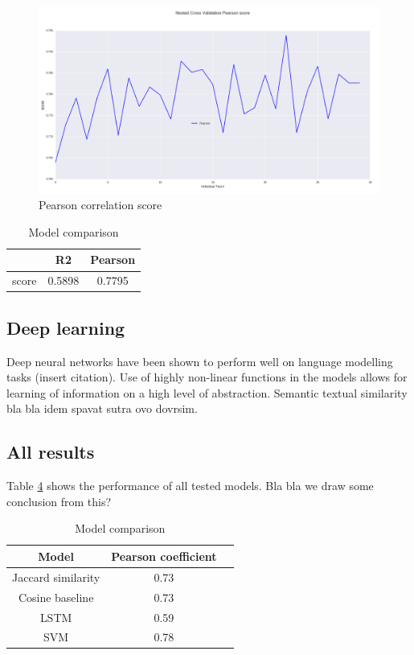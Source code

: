 \documentclass[10pt, a4paper]{article}
\begin{document}
\begin{table}[h!]
\begin{figure}[h!]
\begin{center}
	\centering
	\includegraphics[scale=0.36]{Pearson.png}
	\caption{Pearson correlation score}
\end{center}
\end{figure}

\begin{table}
\caption{Averaged scores}
\label{tab:narrow-table}
\begin{center}
\begin{tabular}{ccc}
\toprule
& R2 & Pearson\\
\midrule
score & 0.5898 & 0.7795 \\
\bottomrule
\end{tabular}
\end{center}
\end{table}

\subsection{Deep learning}

Deep neural networks have been shown to perform well on language modelling tasks
(insert citation). Use of highly non-linear functions in the models allows for learning of information on a high level of abstraction. Semantic textual similarity bla bla idem spavat sutra ovo dovrsim.

\subsection{All results}

Table \ref{tab:all_results} shows the performance of all tested models.
Bla bla we draw some conclusion from this?
\begin{table}
	\caption{Model comparison}
\label{tab:all_results}
\begin{center}
\begin{tabular}{ccc}
\toprule
Model & Pearson coefficient \\
\midrule
Jaccard similarity & 0.73 \\
Cosine baseline & 0.73 \\
LSTM & 0.59 \\
SVM & 0.78 \\
\bottomrule
\end{tabular}
\end{center}
\end{table}



\end{table}
\end{document}
